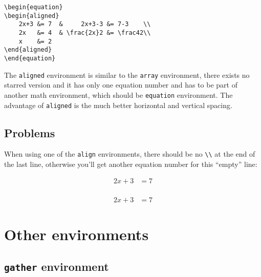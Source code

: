 \begin{table}[htb]
\begin{lstlisting}
\begin{equation}
\begin{aligned}
    2x+3 &= 7  &     2x+3-3 &= 7-3    \\
    2x   &= 4  & \frac{2x}2 &= \frac42\\
    x    &= 2
\end{aligned}
\end{equation}
\end{lstlisting}

The \verb|aligned| environment is similar to the \verb|array| 
environment, there exists no
starred version and it has only one equation number and has to be part of 
another math environment, which should be \verb|equation| environment. 
The advantage of \verb|aligned| is the much
 better horizontal and vertical spacing.    %


\subsection{Problems}
When using one of the \verb+align+ environments, there should be no \verb+\\+ at the
end of the last line, otherwise you'll get another equation number for this  
``empty{}'' line:    %

\begin{LTXexample}[width=0.65\linewidth]
\begin{align}
    2x+3 &= 7\\
\end{align}
\end{LTXexample}

\begin{LTXexample}[width=0.65\linewidth]
\begin{align}
    2x+3 &= 7
\end{align}
\end{LTXexample}
\section{Other environments}


\subsection{\texttt{gather} environment}


\end{table}
